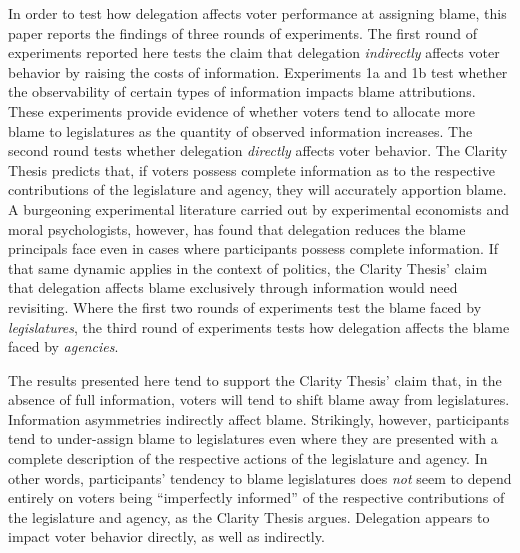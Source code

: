 \documentclass{article}
\begin{document}
In order to test how delegation affects voter performance at assigning blame, this paper reports the findings of three rounds of experiments. The first round of experiments reported here tests the claim that delegation \emph{indirectly} affects voter behavior by raising the costs of information. Experiments 1a and 1b test whether the observability of certain types of information impacts blame attributions. These experiments provide evidence of whether voters tend to allocate more blame to legislatures as the quantity of observed information increases. The second round tests whether delegation \emph{directly} affects voter behavior. The Clarity Thesis predicts that, if voters possess complete information as to the respective contributions of the legislature and agency, they will accurately apportion blame. A burgeoning experimental literature carried out by experimental economists and moral psychologists, however, has found that delegation reduces the blame principals face even in cases where participants possess complete information. \citep{Hamman2010, Coffman2011} If that same dynamic applies in the context of politics, the Clarity Thesis' claim that delegation affects blame exclusively through information would need revisiting. Where the first two rounds of experiments test the blame faced by \emph{legislatures}, the third round of experiments tests how delegation affects the blame faced by \emph{agencies}. 

The results presented here tend to support the Clarity Thesis' claim that, in the absence of full information, voters will tend to shift blame away from legislatures. Information asymmetries indirectly affect blame. Strikingly, however, participants tend to under-assign blame to legislatures even where they are presented with a complete description of the respective actions of the legislature and agency. In other words, participants' tendency to blame legislatures does \emph{not} seem to depend entirely on voters being ``imperfectly informed'' \citep[p. 1044]{Stephenson2006} of the respective contributions of the legislature and agency, as the Clarity Thesis argues. Delegation appears to impact voter behavior directly, as well as indirectly.
 
\end{document}
